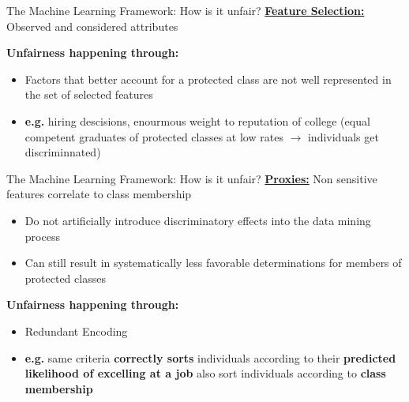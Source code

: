 \begin{frame}{The Machine Learning Framework: How is it unfair? \cite{Barocas.2016, barocas-hardt-narayanan}}
    \underline{\textbf{Feature Selection:}} Observed and considered attributes \newline 
    
    \begin{block}{\textbf{Unfairness happening through:}}
    \begin{itemize}
        \item Factors that better account for a protected class are not well represented in the set of selected features 
        \item \textbf{e.g.} hiring descisions, enourmous weight to reputation of college (equal competent graduates of protected classes at low rates $\rightarrow$ individuals get discriminnated)
    \end{itemize}
        \end{block}
\end{frame}

\begin{frame}{The Machine Learning Framework: How is it unfair? \cite{Barocas.2016, barocas-hardt-narayanan}}
    \underline{\textbf{Proxies:}} Non sensitive features correlate to class membership
    \begin{itemize}
        \item Do not artificially introduce discriminatory effects into the data mining process
        \item Can still result in systematically less favorable determinations for members of protected classes
    \end{itemize} 

    \begin{block}{\textbf{Unfairness happening through:}}
    \begin{itemize}
        \item  Redundant Encoding
        \item \textbf{e.g.} same criteria \textbf{correctly sorts} individuals according to their \textbf{predicted likelihood of excelling at a job} also sort individuals according to \textbf{class membership}
    \end{itemize}
        \end{block}
\end{frame}

